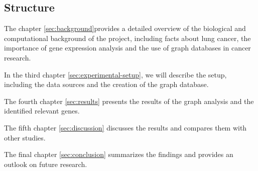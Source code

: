 \subsection{Structure}  \label{subsec:structure}

The chapter \ref{sec:background}provides a detailed overview of the biological and computational background of the project,
including facts about lung cancer, the importance of gene expression analysis and the use of graph databases in cancer research.

In the third chapter \ref{sec:experimental-setup}, we will describe the setup,
including the data sources and the creation of the graph database.

The fourth chapter \ref{sec:results} presents the results of the graph analysis and the identified relevant genes.

The fifth chapter \ref{sec:discussion} discusses the results and compares them with other studies.

The final chapter \ref{sec:conclusion} summarizes the findings and provides an outlook on future research.